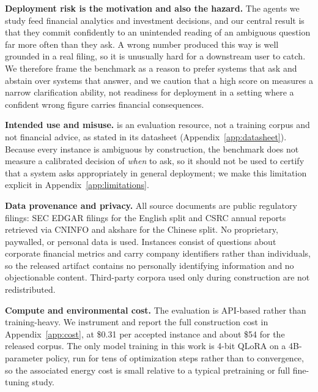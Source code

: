 \textbf{Deployment risk is the motivation and also the hazard.} The agents we study feed
financial analytics and investment decisions, and our central result is that they commit
confidently to an unintended reading of an ambiguous question far more often than they ask.
A wrong number produced this way is well grounded in a real filing, so it is unusually hard
for a downstream user to catch. We therefore frame the benchmark as a reason to prefer
systems that ask and abstain over systems that answer, and we caution that a high score on
\fininteract measures a narrow clarification ability, not readiness for deployment in a
setting where a confident wrong figure carries financial consequences.

\textbf{Intended use and misuse.} \fininteract is an evaluation resource, not a training
corpus and not financial advice, as stated in its datasheet (Appendix~\ref{app:datasheet}).
Because every instance is ambiguous by construction, the benchmark does not measure a
calibrated decision of \emph{when} to ask, so it should not be used to certify that a system
asks appropriately in general deployment; we make this limitation explicit in
Appendix~\ref{app:limitations}.

\textbf{Data provenance and privacy.} All source documents are public regulatory filings:
SEC EDGAR filings for the English split and CSRC annual reports retrieved via CNINFO and
akshare for the Chinese split. No proprietary, paywalled, or personal data is used. Instances
consist of questions about corporate financial metrics and carry company identifiers rather
than individuals, so the released artifact contains no personally identifying information and
no objectionable content. Third-party corpora used only during construction are not
redistributed.

\textbf{Compute and environmental cost.} The evaluation is API-based rather than
training-heavy. We instrument and report the full construction cost in
Appendix~\ref{app:cost}, at \$0.31 per accepted instance and about \$54 for the released
corpus. The only model training in this work is 4-bit QLoRA on a 4B-parameter policy, run for
tens of optimization steps rather than to convergence, so the associated energy cost is small
relative to a typical pretraining or full fine-tuning study.
